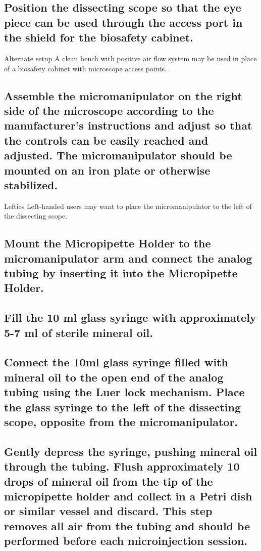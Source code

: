 \documentclass[11pt]{article}
\begin{document}
\subsection{{\sffamily } Position the dissecting scope so that the eye piece can be used through the access port in the shield for the biosafety cabinet.}
\label{sec:orgheadline4}
\begin{bclogo}[logo=\bcinfo, couleurBarre=Black, noborder=true, couleur=gray!10]{     Alternate setup}
A clean bench with positive air flow system may be used in place of a biosafety cabinet with microscope access points.\\
\end{bclogo}
\subsection{{\sffamily } Assemble the micromanipulator on the right side of the microscope according to the manufacturer's instructions and adjust so that the controls can be easily reached and adjusted. The micromanipulator should be mounted on an iron plate or otherwise stabilized.}
\label{sec:orgheadline5}
\begin{bclogo}[logo=\bcinfo, couleurBarre=Black, noborder=true, couleur=gray!10]{     Lefties}
Left-handed users may want to place the micromanipulator to the left of the dissecting scope.\\
\end{bclogo}
\subsection{{\sffamily } Mount the Micropipette Holder to the micromanipulator arm and connect the analog tubing by inserting it into the Micropipette Holder.}
\label{sec:orgheadline6}
\subsection{{\sffamily } Fill the 10 ml glass syringe with approximately 5-7 ml of sterile mineral oil.}
\label{sec:orgheadline7}
\subsection{{\sffamily } Connect the 10ml glass syringe filled with mineral oil to the open end of the analog tubing using the Luer lock mechanism. Place the glass syringe to the left of the dissecting scope, opposite from the micromanipulator.}
\label{sec:orgheadline8}
\subsection{{\sffamily } Gently depress the syringe, pushing mineral oil through the tubing. Flush approximately 10 drops of mineral oil from the tip of the micropipette holder and collect in a Petri dish or similar vessel and discard. This step removes all air from the tubing and should be performed before each microinjection session.}
\label{sec:orgheadline9}
\end{document}
